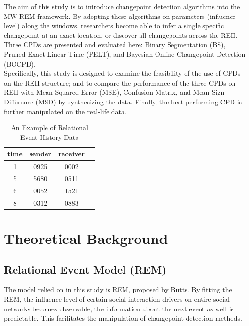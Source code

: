 \documentclass[]{interact}
\theoremstyle{plain}%
\theoremstyle{definition}
\theoremstyle{remark}
\begin{document}
The aim of this study is to introduce changepoint detection algorithms into the MW-REM framework. By adopting these algorithms on parameters (influence level) along the windows, researchers become able to infer a single specific changepoint at an exact location, or discover all changepoints across the REH. Three CPDs are presented and evaluated here: Binary Segmentation (BS), Pruned Exact Linear Time (PELT), and Bayesian Online Changepoint Detection (BOCPD).\\

Specifically, this study is designed to examine the feasibility of the use of CPDs on the REH structure; and to compare the performance of the three CPDs on REH with Mean Squared Error (MSE), Confusion Matrix, and Mean Sign Difference (MSD) by synthesizing the data. Finally, the best-performing CPD is further manipulated on the real-life data.\\


\begin{table}[h]
	\centering
	\begin{tabular}{cccc}
		\hline
		time & sender & receiver \\ \hline
		1 & 0925 & 0002 \\
		5 & 5680 & 0511 \\
		6 & 0052 & 1521 \\
		8 & 0312 & 0883 \\ \hline
	\end{tabular}
	\caption{An Example of Relational Event History Data}
	\label{Table 1}
\end{table}


\section{\fontsize{14}{15}\selectfont Theoretical Background}

\subsection{Relational Event Model (REM)}

\hspace{0.2cm} The model relied on in this study is REM, proposed by Butts\cite{buttsRelationalEventFramework2008}. By fitting the REM, the influence level of certain social interaction drivers on entire social networks becomes observable, the information about the next event as well is predictable. This facilitates the manipulation of changepoint detection methods.\\ 
\end{document}
